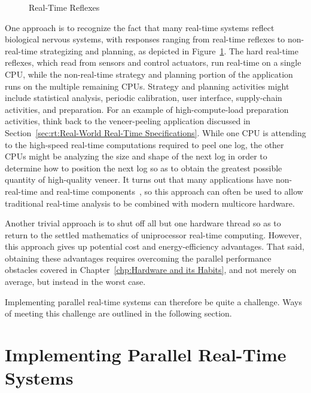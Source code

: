 \begin{figure}[tb]
\centering
{}
\caption{Real-Time Reflexes}
\label{fig:rt:Real-Time Reflexes}
\end{figure}

One approach is to recognize the fact that many real-time systems
reflect biological nervous systems, with responses ranging from
real-time reflexes to non-real-time strategizing and planning,
as depicted in
Figure~\ref{fig:rt:Real-Time Reflexes}.
The hard real-time reflexes, which read from sensors and control
actuators, run real-time on a single CPU, while the non-real-time
strategy and planning portion of the application runs on the multiple
remaining CPUs.
Strategy and planning activities might include statistical analysis,
periodic calibration, user interface, supply-chain activities, and
preparation.
For an example of high-compute-load preparation activities, think back
to the veneer-peeling application discussed in
Section~\ref{sec:rt:Real-World Real-Time Specifications}.
While one CPU is attending to the high-speed real-time computations
required to peel one log, the other CPUs might be analyzing the size
and shape of the next log in order to determine how to position the
next log so as to obtain the greatest possible quantity of high-quality
veneer.
It turns out that many applications have non-real-time and real-time
components~\cite{RobertBerry2008IBMSysJ}, so this approach can
often be used to allow traditional real-time analysis to be combined
with modern multicore hardware.

Another trivial approach is to shut off all but one hardware thread so as
to return to the settled mathematics of uniprocessor real-time
computing.
However, this approach gives up potential cost and energy-efficiency
advantages.
That said, obtaining these advantages requires overcoming the parallel
performance obstacles covered in
Chapter~\ref{chp:Hardware and its Habits},
and not merely on average, but instead in the worst case.

Implementing parallel real-time systems can therefore be quite a
challenge.
Ways of meeting this challenge are outlined in the following section.

\section{Implementing Parallel Real-Time Systems}
\label{sec:rt:Implementing Parallel Real-Time Systems}


